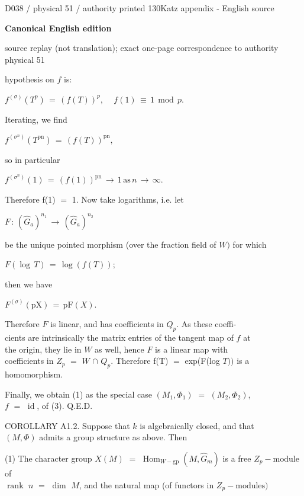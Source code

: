 \documentclass[9pt]{article}
\newcommand{\CanonText}[1]{\par{\fontsize{8.0}{9.35}\selectfont\RaggedRight #1\par}\vspace{2.2pt}}
\newcommand{\CanonDisplay}[1]{\par\vspace{1.2pt}\begin{center}{\fontsize{7.2}{8.4}\selectfont\(\displaystyle #1\)}\end{center}\vspace{1.2pt}}
\newcommand{\LayerTitle}{Canonical English edition}
\begin{document}
\noindent\begin{minipage}[t][\dimexpr\textheight-5pt\relax][t]{\textwidth}
{\sffamily\fontsize{7.3}{8.2}\selectfont\color{Quiet} D038 / physical 51 / authority printed 130\hfill Katz appendix - English source}
\par{}\vspace{4.5pt}
{\sffamily\fontsize{10.4}{11.6}\selectfont\bfseries\color{Accent} \LayerTitle}
\par{\sffamily\fontsize{6.7}{7.7}\selectfont\color{Quiet} source replay (not translation); exact one-page correspondence to authority physical 51}
\vspace{5pt}
\CanonText{hypothesis on \(f\) is:}
\CanonDisplay{f^{(\sigma{})}(T^{p})\,=\,(f(T))^{p},\quad\,f(1)\,\equiv{}\,1\,\operatorname{mod}\,p.}
\CanonText{Iterating, we find}
\CanonDisplay{f^{(\sigma{}^{n})}(T^{\mathrm{pn}})\,=\,(f(T))^{\mathrm{pn}},}
\CanonText{so in particular}
\CanonDisplay{f^{(\sigma{}^{n})}(1)\,=\,(f(1))^{\mathrm{pn}}\,\to{}\,1\,\text{as}\,n\,\to{}\,\infty{}.}
\CanonText{Therefore f(1) \(=\) 1. Now take logarithms, i.e. let}
\CanonDisplay{F\,:\,(\widehat{G}_{a})^{n_{1}}\,\to{}\,(\widehat{G}_{a})^{n_{2}}}
\CanonText{be the unique pointed morphism (over the fraction field of \(W)\) for which}
\CanonDisplay{F(\operatorname{log}\,T)\,=\,\operatorname{log}(f(T));}
\CanonText{then we have}
\CanonDisplay{F^{(\sigma{})}(\text{pX})\,=\,\text{pF}(X).}
\CanonText{Therefore \(F\) is linear, and has coefficients in \(Q_{p}\). As these coeffi-\\cients are intrinsically the matrix entries of the tangent map of \(f\) at\\the origin, they lie in \(W\) as well, hence \(F\) is a linear map with\\coefficients in \(Z_{p}\) \(=\) \(W\) \(\cap{}\) \(Q_{p}\). Therefore f(T) \(=\) exp(F(log \(T))\) is a\\homomorphism.}
\CanonText{Finally, we obtain (1) as the special case \((M_{1},\Phi{}_{1})\) \(=\) \((M_{2},\Phi{}_{2})\),\\\(f\) \(=\) \(\operatorname{id}\), of (3). Q.E.D.}
\CanonText{COROLLARY A1.2. Suppose that \(k\) is algebraically closed, and that\\\((M,\Phi{})\) admits a group structure as above. Then}
\CanonText{(1) The character group \(X(M)\) \(=\) \(\operatorname{Hom}_{W-\mathrm{gp}}(M,\widehat{G}_{m})\) is a free \(Z_{p}-\text{module}\) of\\\(\operatorname{rank}\) \(n\) \(=\) \(\operatorname{dim}\) \(M\), and the natural map (of functors in \(Z_{p}-\text{modules})\)}

\end{minipage}
\end{document}
